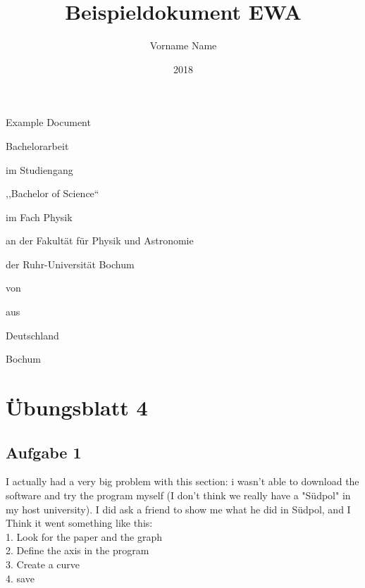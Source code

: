 \documentclass[11pt,
               a4paper,
               parskip=half,
               ]{scrartcl}
\title{Beispieldokument EWA} %
\author{Vorname Name} %
\date{2018} %
\newcommand{\theothertitle}{Example Document} %
\newcommand{\bachelormaster}{Bachelor} %
\newcommand{\sciencearts}{Science} %
\newcommand{\placeofbirth}{Deutschland} %
\newcommand{\location}{Bochum}
\begin{document}
\begin{titlepage}
  \centering
  {\huge\titlefont\thetitle\par
                  \bigskip\bigskip
                  \theothertitle\par}
  \vspace{2cm}

  \begin{spacing}{0.8}
    {\LARGE \bachelormaster arbeit\par
            \bigskip\medskip
            im Studiengang\par
            ,,\bachelormaster{} of \sciencearts``\par
            im Fach Physik\par
            \bigskip\medskip
            an der Fakultät für Physik und Astronomie\par
            der Ruhr-Universität Bochum\par}

    \vfill

    {\LARGE von\par
            \theauthor\par
            \bigskip\medskip
            aus\par
            \placeofbirth\par}
  \end{spacing}

  \vspace{1.8cm}

  {\LARGE \location{} \thedate\par}
\end{titlepage}
\restoregeometry
\cleardoublepage

\tableofcontents
\cleardoublepage


\section{Übungsblatt 4}

\subsection{Aufgabe 1}

I actually had a very big problem with this section: i wasn't able to download the software and try the program myself (I don't think we really have a "Südpol" in my host university). I did ask a friend to show me what he did in Südpol, and I Think it went something like this:\\
1. Look for the paper and the graph \\
2. Define the axis in the program\\
3. Create a curve\\
4. save\\
\end{document}
